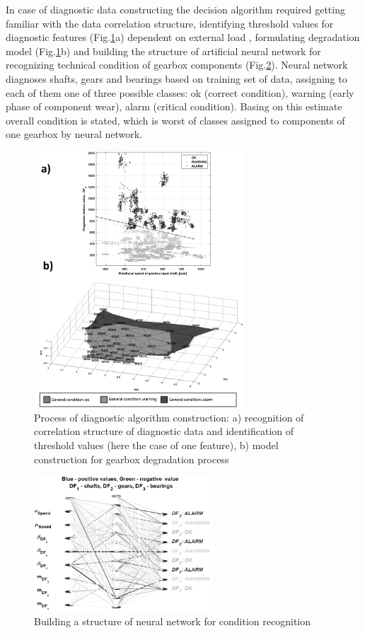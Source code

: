 In case of diagnostic data constructing the decision algorithm required getting familiar with the data correlation structure, identifying threshold values for diagnostic features (Fig.\ref{fig: f5}a) dependent on external load \cite{Bartelmus2009,Stefaniak2014,Stefaniak2016,StefaniakZimroz2014,Zimroz2014}, formulating degradation model (Fig.\ref{fig: f5}b) and building the structure of artificial neural network for recognizing technical condition of gearbox components (Fig.\ref{fig: f5c}). Neural network diagnoses shafts, gears and bearings based on training set of data, assigning  to each of them one of three possible classes: ok (correct condition), warning (early phase of component wear), alarm (critical condition). Basing on this estimate overall condition is stated, which is worst of classes assigned to components of one gearbox by neural network.
\begin{figure}[ht!]
\centering
\includegraphics[width =0.7\textwidth]{Wykresy/Fig_5.png}
\caption{Process of diagnostic algorithm construction: a) recognition of correlation structure of diagnostic data and identification of threshold values (here the case of one feature), b) model construction for gearbox degradation process}
\label{fig: f5}
\end{figure}
\begin{figure}[ht!]
\centering
\includegraphics[width =0.6\textwidth]{Wykresy/Fig_5c.png}
\caption{Building a structure of neural network for condition recognition}
\label{fig: f5c}
\end{figure}
